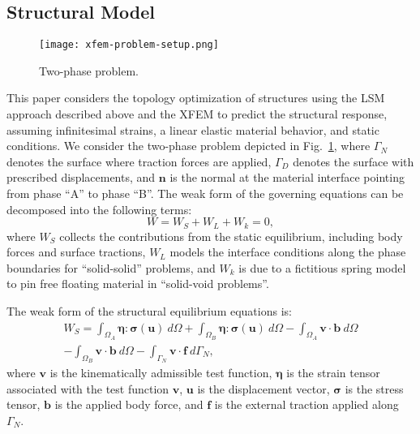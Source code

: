 \subsection{Structural Model}
\label{sec:structural-model}
%
\begin{figure}
	\centering
	\texttt{[image: xfem-problem-setup.png]}
	\caption{Two-phase problem.}
	\label{fig:xfem-problem-setup}
\end{figure}
%
This paper considers the topology optimization of structures using the LSM approach described above and the XFEM to predict the structural response, assuming infinitesimal strains, a linear elastic material behavior, and static conditions. We consider the two-phase problem depicted in Fig.~\ref{fig:xfem-problem-setup}, where $\Gamma_{N}$ denotes the surface where traction forces are applied, $\Gamma_{D}$ denotes the surface with prescribed displacements, and $\mathbf{n}$ is the normal at the material interface pointing from phase ``A'' to phase ``B''. The weak form of the governing equations can be decomposed into the following terms:
%
\begin{equation}
	\label{eq:residual-equation}
	W = W_{S} + W_{L} + W_{k} = 0,
\end{equation}
%
where $W_{S}$ collects the contributions from the static equilibrium, including body forces and surface tractions, $W_{L}$ models the interface conditions along the phase boundaries for ``solid-solid'' problems, and $W_{k}$ is due to a fictitious spring model to pin free floating material in ``solid-void problems''.

The weak form of the structural equilibrium equations is:
%
\begin{multline}
\label{eq:weak-form}
	W_{S} = \int_{\Omega_A} { \pmb{\eta} \colon \pmb{\sigma}(\mathbf{u}) \ d \Omega}
		  + \int_{\Omega_B} { \pmb{\eta} \colon \pmb{\sigma}(\mathbf{u}) \ d \Omega}
		  - \int_{\Omega_A} { \mathbf{v} \cdot \mathbf{b} \ d \Omega } \\
		  - \int_{\Omega_B} { \mathbf{v} \cdot \mathbf{b} \ d \Omega }
		  - \int_{\Gamma_N} { \mathbf{v} \cdot \mathbf{f} \ d \Gamma_N },
\end{multline}
%
where $\mathbf{v}$ is the kinematically admissible test function, $\pmb{\eta}$ is the strain tensor associated with the test function $\mathbf{v}$, $\mathbf{u}$ is the displacement vector, $\pmb{\sigma}$ is the stress tensor, $\mathbf{b}$ is the applied body force, and $\mathbf{f}$ is the external traction applied along $\Gamma_{N}$.

